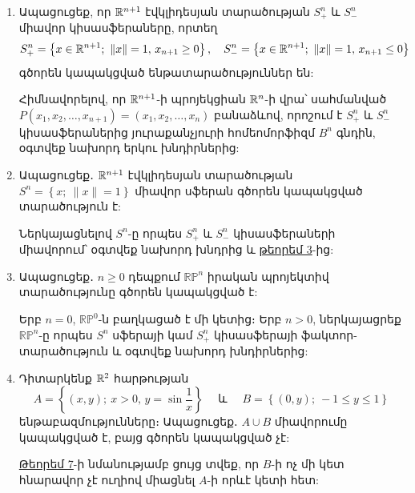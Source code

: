 \begin{enumerate}[label=\thesection.\arabic*.]
\item Ապացուցեք, որ $\mathbb{R}^{n+1}$ էվկլիդեսյան տարածության $S^n_+$ և $S^n_-$ միավոր կիսա\-սֆե\-րաները, որտեղ
\[ 
S^n_+ = \left\{x \in \mathbb{R}^{n+1};\ \|x\|=1,\, x_{n+1} \ge 0\right\}, \quad S^n_- = \left\{x \in \mathbb{R}^{n+1};\ \|x\|=1,\, x_{n+1} \le 0\right\}
\]
գծորեն կապակցված ենթատարածություններ են:
\begin{hint}
Հիմնավորելով, որ $\mathbb{R}^{n+1}$-ի պրոյեկցիան $\mathbb{R}^n$-ի վրա՝ սահմանված $P(x_1, x_2, \dots, x_{n+1}) = (x_1, x_2, \dots, x_n)$ բանաձևով, որոշում է $S^n_+$ և $S^n_-$ կիսա\-սֆե\-րաներից յուրաքանչյուրի հոմեոմորֆիզմ $B^n$ գնդին, օգտվեք նախորդ երկու խնդիր\-ներից:
\end{hint}

\item Ապացուցեք․ $\mathbb{R}^{n+1}$ էվկլիդեսյան տարածության $S^n = \left\{x;\ \|x\|=1\right\}$ միավոր սֆերան գծորեն կապակցված տարածություն է:
\begin{hint}
Ներկայացնելով $S^n$-ը որպես $S^n_+$ և $S^n_-$ կիսասֆերաների միավո\-րում՝ օգտվեք նախորդ խնդրից և \hyperref[ch16thm3]{թեորեմ 3}-ից:
\end{hint}

\item Ապացուցեք․ $n \ge 0$ դեպքում $\mathbb{RP}^n$ իրական պրոյեկտիվ տարածությունը գծո\-րեն կապակցված է:
\begin{hint}
Երբ $n=0$, $\mathbb{RP}^0$-ն բաղկացած է մի կետից։ Երբ $n > 0$, ներկա\-յաց\-րեք $\mathbb{RP}^n$-ը որպես $S^n$ սֆերայի կամ $S^n_+$ կիսասֆերայի ֆակտոր-տարածու\-թյուն և օգտվեք նախորդ խնդիրներից:
\end{hint}

\item Դիտարկենք $\mathbb{R}^2$ հարթության 
\[
A = \left\{(x, y);\ x > 0,\, y = \sin \dfrac{1}{x}\right\} \quad  \text{ և } \quad B = \left\{(0, y);\ -1 \le y \le 1\right\}
\] 
ենթաբազմությունները։ Ապացուցեք․ $A \cup B$ միավորումը կապակցված է, բայց գծորեն կապակցված չէ:
\begin{hint}
\hyperref[ch16thm7]{Թեորեմ 7}-ի նմանությամբ ցույց տվեք, որ $B$-ի ոչ մի կետ հնա\-րա\-վոր չէ ուղիով միացնել $A$-ի որևէ կետի հետ:
\end{hint}

\end{enumerate}
